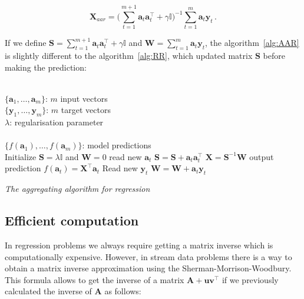 \begin{equation}
\label{eq:AARexpand}
\mathbf{X}_{aar} = \displaystyle \big (\sum_{t=1}^{m+1}
\mathbf{a}_t \mathbf{a}_t  ^\intercal + \gamma \mathbb{I}\big )^{-1}
\sum_{t=1}^m \mathbf{a}_t \mathbf{y}_t \, .
\end{equation}

If we define $\displaystyle\mathbf{S}= \sum_{t=1}^{m+1} \mathbf{a}_t
\mathbf{a}_t  ^\intercal + \gamma \mathbb{I} $ and $\mathbf{W}=
\displaystyle\sum_{t=1}^m \mathbf{a}_t \mathbf{y}_t$, the
algorithm~\ref{alg:AAR} is slightly different to the algorithm~\ref{alg:RR}, 
which updated matrix $\mathbf{S}$ before making the prediction:

\begin{algorithm}[ht]
\begin{algorithmic}[1]
\REQUIRE $\,$ \\
$\{\mathbf{a}_1,\dots,\mathbf{a}_{m} \}$: $m$ input vectors \\
$\{\mathbf{y}_1,\dots,\mathbf{y}_{m} \}$: $m$ target vectors \\
$\lambda$: regularisation parameter \\
\ENSURE  $\,$ \\
$\{f(\mathbf{a}_1),\dots,f(\mathbf{a}_{m}) \}$: model predictions \\
\STATE Initialize $\mathbf{S}=\lambda \mathbb{I}$
and $\mathbf{W}=0$
	\STATE read new $\mathbf{a}_t$
   	\STATE $\mathbf{S} = \mathbf{S} + \mathbf{a}_t \mathbf{a}_t^\intercal$
	\STATE $\mathbf{X}=\mathbf{S}^{-1}\mathbf{W}$
	\STATE output prediction $f(\mathbf{a}_t) = \mathbf{X}^\intercal \mathbf{a}_t$
   	\STATE Read new $\mathbf{y}_t$
    	\STATE $\mathbf{W} = \mathbf{W} + \mathbf{a}_t \mathbf{y}_t$
\ENDFOR
\end{algorithmic}
\caption{{\em The aggregating algorithm for regression}}
\label{alg:AAR}
\end{algorithm}


\subsection{Efficient computation}
In regression problems we always require getting a matrix inverse which is
computationally expensive. However, in stream data problems there is a way to
obtain a matrix inverse approximation using the Sherman-Morrison-Woodbury. This
formula allows to get the inverse of a matrix $\mathbf{A+uv^\top}$ if we previously calculated the
inverse of $\mathbf{A}$ as follows:

